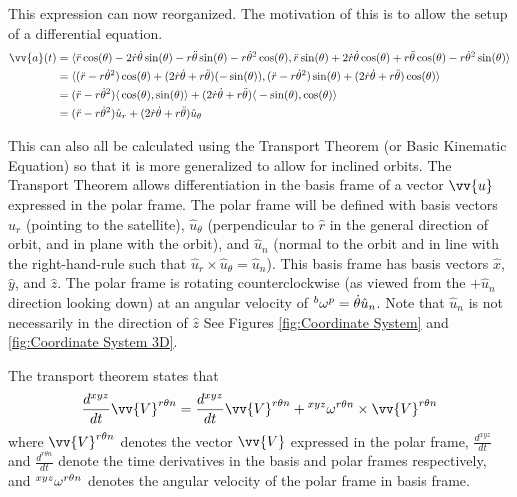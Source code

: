 \documentclass[../basicOrbitalDynamics.tex]{subfiles}
\begin{document}
This expression can now reorganized. The motivation of this is to allow the setup of a differential equation.
\begin{align*}
    \vv{a}(t) & =\langle{}\ddot{r}\cos(\theta)-2\dot{r}\dot{\theta}\sin(\theta)-r\ddot{\theta}\sin(\theta)-r\dot{\theta}^2\cos(\theta), \ddot{r}\sin(\theta)+2\dot{r}\dot{\theta}\cos(\theta)+r\ddot{\theta}\cos(\theta)-r\dot{\theta}^2\sin(\theta)\rangle{} \\
              & =\langle{}(\ddot{r}-r\dot{\theta}^2)\cos(\theta)+(2\dot{r}\dot{\theta}+r\ddot{\theta})(-\sin(\theta)), (\ddot{r}-r\dot{\theta}^2)\sin(\theta)+(2\dot{r}\dot{\theta}+r\ddot{\theta})\cos(\theta)\rangle{}                                      \\
              & =(\ddot{r}-r\dot{\theta}^2)\langle{}\cos(\theta),\sin(\theta)\rangle{}+(2\dot{r}\dot{\theta}+r\ddot{\theta})\langle{}-\sin(\theta), \cos(\theta)\rangle{}                                                                                     \\
              & =(\ddot{r}-r\dot{\theta}^2)\hat{u}_r+(2\dot{r}\dot{\theta}+r\ddot{\theta})\hat{u}_\theta
\end{align*}

This can also all be calculated using the Transport Theorem (or Basic Kinematic Equation) so that it is more generalized to allow for inclined orbits. The Transport Theorem allows differentiation in the basis frame of a vector $\vv{u}$ expressed in the polar frame. The polar frame will be defined with basis vectors $\hat{u}_r$ (pointing to the satellite), $\hat{u}_\theta$ (perpendicular to $\hat{r}$ in the general direction of orbit, and in plane with the orbit), and $\hat{u}_n$ (normal to the orbit and in line with the right-hand-rule such that $\hat{u}_r\times\hat{u}_\theta=\hat{u}_n$). This basis frame has basis vectors $\hat{x}$, $\hat{y}$, and $\hat{z}$. The polar frame is rotating counterclockwise (as viewed from the $+\hat{u}_n$ direction looking down) at an angular velocity of $\prescript{b}{}{\omega}^{p}=\dot{\theta}\hat{u}_n$. Note that $\hat{u}_n$ is not necessarily in the direction of $\hat{z}$ See Figures \ref{fig:Coordinate System} and \ref{fig:Coordinate System 3D}.

The transport theorem states that
$$\frac{d^{xyz}}{dt}{\vv{V}^{r\theta{}n}}=\frac{d^{xyz}}{dt}{\vv{V}^{r\theta{}n}}+\prescript{xyz}{}{\omega}^{r\theta{}n}\times{}\vv{V}^{r\theta{}n}$$
where $\vv{V}^{r\theta{}n}$ denotes the vector $\vv{V}$ expressed in the polar frame, $\frac{d^{xyz}}{dt}$ and $\frac{d^{r\theta{}n}}{dt}$ denote the time derivatives in the basis and polar frames respectively, and $\prescript{xyz}{}{\omega}^{r\theta{}n}$ denotes the angular velocity of the polar frame in basis frame.
\end{document}
